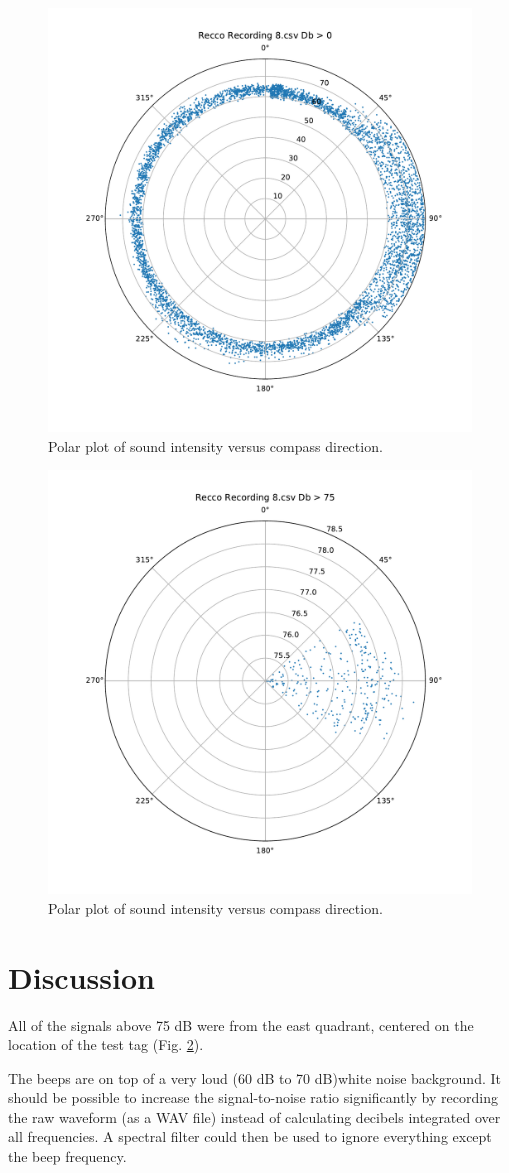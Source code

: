 \documentclass[12pt,letterpaper,english,bibliography=totocnumbered, abstract=on]{scrartcl}
\begin{document}
\begin{figure}[p]
	\centering
	\includegraphics[width=0.7\linewidth]{images/polar0}
	\caption{Polar plot of sound intensity versus compass direction.}
	\label{fig:polar0}
\end{figure}

\begin{figure}[p]
	\centering
	\includegraphics[width=0.7\linewidth]{images/polar75}
	\caption{Polar plot of sound intensity versus compass direction.}
	\label{fig:polar75}
\end{figure}

\section{Discussion}

All of the signals above 75 dB were from the east quadrant, centered on the location of the test tag (Fig. \ref{fig:polar75}).

The beeps are on top of a very loud (60 dB to 70 dB)white noise background. It should be possible to increase the  signal-to-noise ratio significantly by recording the raw waveform (as a WAV file) instead of calculating decibels integrated over all frequencies. A spectral filter could then be used to ignore everything except the beep frequency.
\end{document}
